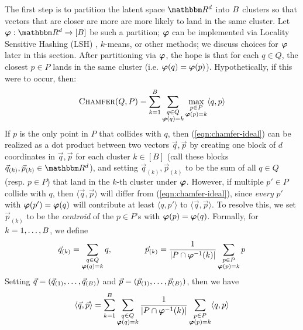 The first step is to partition the latent space $\R^d$ into $B$ clusters so that vectors that are closer are more are more likely to land in the same cluster. 
Let $\bvarphi:\R^d \to [\buckets]$ be such a partition; $\boldsymbol{\varphi}$ can be implemented via Locality Sensitive Hashing (LSH) \cite{HIM12}, $k$-means, or other methods; we discuss choices for $\boldsymbol{\varphi}$ later in this section. After partitioning via $\boldsymbol{\varphi}$, the hope is that for each $q \in Q$, the closest $p \in P$ lands in the same cluster (i.e. $\boldsymbol{\varphi}(q) = \boldsymbol{\varphi}(p)$). Hypothetically, if this were to occur, then:
\begin{equation}\label{eqn:chamfer-ideal}
\textsc{Chamfer}(Q,P) = \sum_{k=1}^{B} \sum_{\substack{q \in Q \\ \boldsymbol{\varphi}(q) = k}} \max_{\substack{p \in P \\ \boldsymbol{\varphi}(p)=k}}\langle q,p\rangle
\end{equation}
If $p$ is the only point in $P$ that collides with $q$, then (\ref{eqn:chamfer-ideal}) can be realized as a dot product between two vectors $\vec{q},\vec{p}$ by creating one block of $d$ coordinates in $\vec{q},\vec{p}$ for each cluster $k \in [B]$ (call these blocks $\vec{q}_{(k)},\vec{p}_{(k)} \in \R^{d}$), and setting $\vec{q}_{(k)},\vec{p}_{(k)}$ to be the sum of all $q \in Q$ (resp. $p \in P$) that land in the $k$-th cluster under $\boldsymbol{\varphi}$. 
 However, if multiple $p' \in P$ collide with $q$, then $\langle \vec{q}, \vec{p} \rangle$ will differ from (\ref{eqn:chamfer-ideal}), since \emph{every} $p'$ with $\boldsymbol{\varphi}(p') = \boldsymbol{\varphi}(q)$ will contribute at least $\langle q,p'\rangle$ to $\langle \vec{q}, \vec{p} \rangle$. To resolve this, we set $\vec{p}_{(k)}$ to be the \emph{centroid} of the $p \in P$'s  with $\boldsymbol{\varphi}(p) = \boldsymbol{\varphi}(q)$. Formally, for $k=1,\dots,B$, we define 
\begin{equation}\label{eqn:define-FDE}
\vec{q}_{(k)}= \sum_{\substack{q \in Q \\ \boldsymbol{\varphi}(q) = k}}  q, \qquad \qquad \vec{p}_{(k)} =  \frac{1}{|P \cap \boldsymbol{\varphi}^{-1}(k)|} \sum_{\substack{p \in P \\ \boldsymbol{\varphi}(p)=k}} p \end{equation}
Setting $\vec{q} =  (\vec{q}_{(1)},\dots,\vec{q}_{(B)})$ and $\vec{p} = (\vec{p}_{(1)},\dots,\vec{p}_{(B)})$, then we have 
\begin{equation}\label{eqn:chamfer-approx}
  \langle \vec{q}, \vec{p} \rangle =   \sum_{k=1}^{B} \sum_{\substack{q \in Q\\ \boldsymbol{\varphi}(q) = k}}  \frac{1}{|P \cap \boldsymbol{\varphi}^{-1}(k)|} \sum_{\substack{p \in P \\ \boldsymbol{\varphi}(p)=k}} \langle q,p\rangle
\end{equation}
